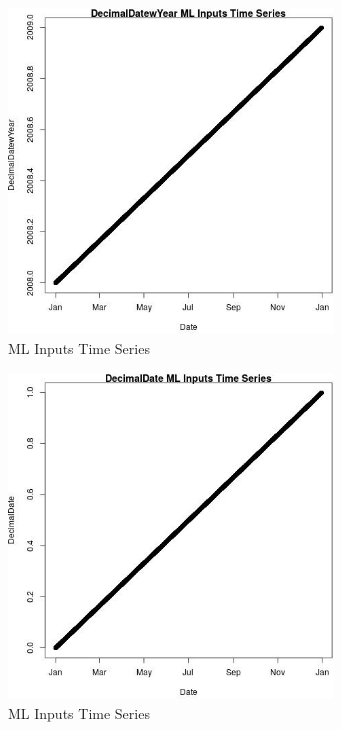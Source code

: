 \begin{figure} 
\centering  
\includegraphics[width=0.77\textwidth]{Code_Outputs/Report_ML_input_PM25_Step4_part_e_de_duplicated_aves_DecimalDatewYearvDate.jpg} 
\caption{\label{fig:Report_ML_input_PM25_Step4_part_e_de_duplicated_avesDecimalDatewYearvDate}ML Inputs Time Series} 
\end{figure} 
 

\begin{figure} 
\centering  
\includegraphics[width=0.77\textwidth]{Code_Outputs/Report_ML_input_PM25_Step4_part_e_de_duplicated_aves_DecimalDatevDate.jpg} 
\caption{\label{fig:Report_ML_input_PM25_Step4_part_e_de_duplicated_avesDecimalDatevDate}ML Inputs Time Series} 
\end{figure} 
 
